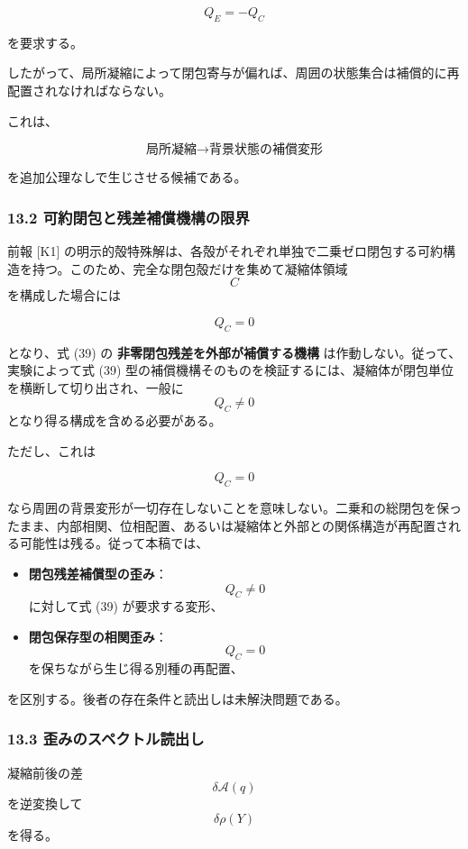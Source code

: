 \documentclass[
  a4paper,
]{ltjsarticle}
\providecommand{\tightlist}{%
  \setlength{\itemsep}{0pt}\setlength{\parskip}{0pt}}
\begin{document}
\[
\boxed{
Q_E=-Q_C
}
\tag{39}
\]

を要求する。

したがって、局所凝縮によって閉包寄与が偏れば、周囲の状態集合は補償的に再配置されなければならない。

これは、

\[
\boxed{
\text{局所凝縮}
\longrightarrow
\text{背景状態の補償変形}
}
\]

を追加公理なしで生じさせる候補である。

\subsubsection{13.2
可約閉包と残差補償機構の限界}\label{ux53efux7d04ux9589ux5305ux3068ux6b8bux5deeux88dcux511fux6a5fux69cbux306eux9650ux754c}

前報 {[}K1{]}
の明示的殻特殊解は、各殻がそれぞれ単独で二乗ゼロ閉包する可約構造を持つ。このため、完全な閉包殻だけを集めて凝縮体領域
\[C\] を構成した場合には

\[
Q_C=0
\]

となり、式 (39) の \textbf{非零閉包残差を外部が補償する機構}
は作動しない。従って、実験によって式 (39)
型の補償機構そのものを検証するには、凝縮体が閉包単位を横断して切り出され、一般に
\[Q_C\neq0\] となり得る構成を含める必要がある。

ただし、これは

\[
Q_C=0
\]

なら周囲の背景変形が一切存在しないことを意味しない。二乗和の総閉包を保ったまま、内部相関、位相配置、あるいは凝縮体と外部との関係構造が再配置される可能性は残る。従って本稿では、

\begin{itemize}
\tightlist
\item
  \textbf{閉包残差補償型の歪み}：\[Q_C\neq0\] に対して式 (39)
  が要求する変形、
\item
  \textbf{閉包保存型の相関歪み}：\[Q_C=0\]
  を保ちながら生じ得る別種の再配置、
\end{itemize}

を区別する。後者の存在条件と読出しは未解決問題である。

\subsubsection{13.3
歪みのスペクトル読出し}\label{ux6b6aux307fux306eux30b9ux30daux30afux30c8ux30ebux8aadux51faux3057}

凝縮前後の差 \[\delta\mathcal A(q)\] を逆変換して \[\delta\rho(Y)\]
を得る。
\end{document}
